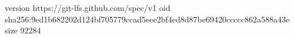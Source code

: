 version https://git-lfs.github.com/spec/v1
oid sha256:9ed1b682202d124bf705779ccad5eee2bf4ed8d87be69420ccccc862a588a43e
size 92284
